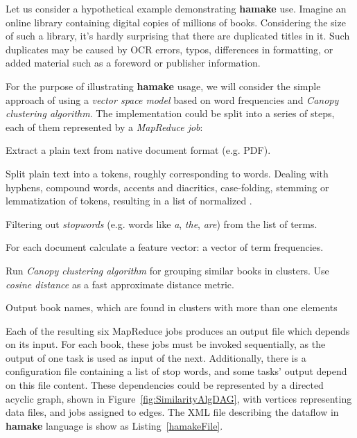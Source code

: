 \documentclass[10pt,conference,letterpaper]{IEEEtran}
\begin{document}
Let us consider a hypothetical example demonstrating \textbf{hamake}
use. Imagine an online library containing digital copies of millions of
books. Considering the size of such a library, it's hardly surprising that
there are duplicated titles in it. Such duplicates may be caused by
OCR errors, typos, differences in formatting, or added material such
as a foreword or publisher information.

For the purpose of illustrating \textbf{hamake} usage, we will
consider the simple approach of using a \textit{vector space
  model}\cite{manning2008introduction} based on word frequencies and
\textit{Canopy clustering algorithm}\cite{efficientClustering}. The
implementation could be split into a series of steps, each of them
represented by a \textit{MapReduce job}:

\begin{description}
\item[\emph{ExtractText}] Extract a plain text from native document format
  (e.g. PDF).
\item[\emph{Tokenize}] Split plain text into a tokens, roughly
  corresponding to words. Dealing with hyphens, compound words,
  accents and diacritics, case-folding, stemming or lemmatization of
  tokens, resulting in a list of normalized .
\item[\emph{FilterStopwords}] Filtering out \textit{stopwords} (e.g. words
  like \textit{a}, \textit{the}, \textit{are}) from the list of
  terms.
\item[\emph{CalculateTF}] For each document calculate a feature
  vector: a vector of term frequencies.
\item[\emph{FindSimilar}] Run \textit{Canopy clustering algorithm}
  for grouping similar books in clusters. Use
  \textit{cosine distance} as a fast approximate distance metric. 
\item[\emph{OutputResult}] Output book names, which are found in
  clusters with more than one elements
\end{description}

Each of the resulting six MapReduce jobs produces an output file which
depends on its input. For each book, these jobs must be invoked
sequentially, as the output of one task is used as input of the next. Additionally, there is a configuration file containing a list of
stop words, and some tasks' output depend on this file content. These
dependencies could be represented by a directed acyclic graph, shown in
Figure~\ref{fig:SimilarityAlgDAG}, with vertices representing data
files, and jobs assigned to edges. The XML file describing the
dataflow in \textbf{hamake} language is show as
Listing~\ref{hamakeFile}.
\end{document}
